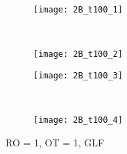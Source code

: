 \documentclass[10pt,letterpaper,fleqn]{article}
\begin{document}
\begin{figure}[h!]
        \centering
        \begin{subfigure}[b]{0.4\textwidth}
                \texttt{[image: 2B\_t100\_1]}
        \end{subfigure}%
        ~ 
        \begin{subfigure}[b]{0.4\textwidth}
                \texttt{[image: 2B\_t100\_2]}
        \end{subfigure}
        
        \begin{subfigure}[b]{0.4\textwidth}
                \texttt{[image: 2B\_t100\_3]}
        \end{subfigure}
        ~
        \begin{subfigure}[b]{0.4\textwidth}
                \texttt{[image: 2B\_t100\_4]}
        \end{subfigure}
        \caption{RO = 1, OT = 1, GLF}
\end{figure}
\pagebreak


\thispagestyle{fancy}
\end{document}
